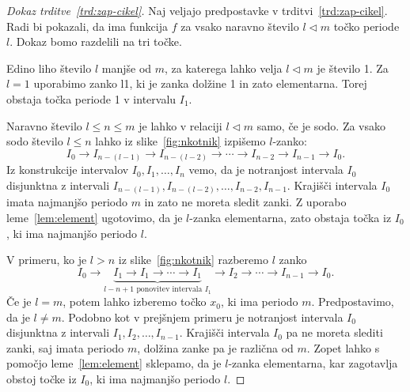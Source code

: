 \documentclass[mat2]{fmfdelo}
\begin{document}
\begin{proof}[Dokaz trditve~\ref{trd:zap-cikel}]
Naj veljajo predpostavke v trditvi~\ref{trd:zap-cikel}. Radi bi pokazali, da ima funkcija $f$ za vsako naravno število $l\triangleleft m$ točko periode $l$. Dokaz bomo razdelili na tri točke.

Edino liho število $l$ manjše od $m$, za katerega lahko velja $l\triangleleft m$ je število 1. Za $l=1$ uporabimo zanko l1, ki je zanka dolžine 1 in zato elementarna. Torej obstaja točka periode 1 v intervalu $I_1$.

Naravno število $l \leq n \leq m$ je lahko v relaciji $l \triangleleft m$ samo, če je sodo. Za vsako sodo število $l \leq n$ lahko iz slike~\ref{fig:nkotnik} izpišemo $l$-zanko:
$$I_0\to I_{n-(l-1)} \to I_{n-(l-2)} \to \cdots \to I_{n-2} \to I_{n-1} \to I_0.$$
Iz konstrukcije intervalov $I_0, I_1, \dots, I_n$ vemo, da je notranjost intervala $I_0$ disjunktna z intervali $I_{n-(l-1)}, I_{n-(l-2)}, \dots, I_{n-2}, I_{n-1}$. Krajišči intervala $I_0$ imata najmanjšo periodo $m$ in zato ne moreta sledit zanki. Z uporabo leme~\ref{lem:element} ugotovimo, da je $l$-zanka elementarna, zato obstaja točka iz $I_0$, ki ima najmanjšo periodo $l$.

V primeru, ko je $l >n$ iz slike~\ref{fig:nkotnik} razberemo $l$ zanko
$$I_0\to\underbrace{I_1 \to I_1 \to \cdots  \to I_1}_{l - n +1 \text{ ponovitev intervala } I_1} \to I_2 \to \cdots \to I_{n-1} \to I_0.$$
Če je $l=m$, potem lahko izberemo točko $x_0$, ki ima periodo $m$. Predpostavimo, da je $l \neq m$. Podobno kot v prejšnjem primeru je notranjost intervala $I_0$ disjunktna z intervali $I_1, I_2, \dots, I_{n-1}$. Krajišči intervala $I_0$ pa ne moreta slediti zanki, saj imata periodo $m$, dolžina zanke pa je različna od $m$. Zopet lahko s pomočjo leme~\ref{lem:element} sklepamo, da je $l$-zanka elementarna, kar zagotavlja obstoj točke iz $I_0$, ki ima najmanjšo periodo $l$.
\end{proof}

\end{document}
